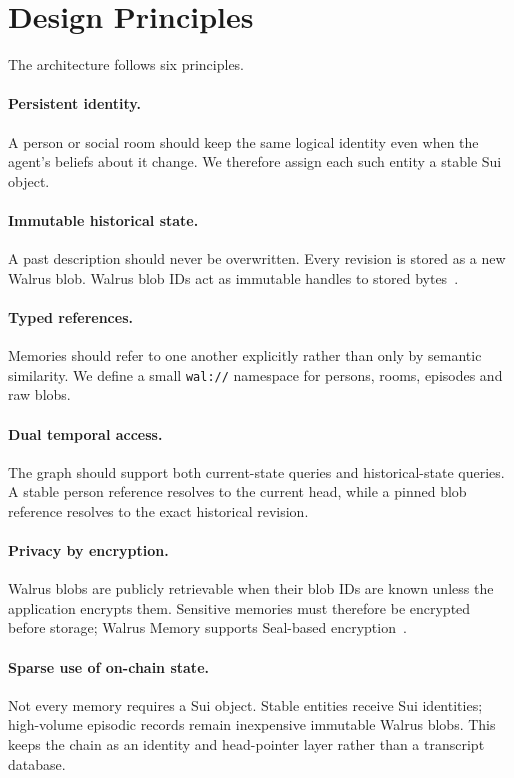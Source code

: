 \documentclass[11pt]{article}
\begin{document}
\section{Design Principles}

The architecture follows six principles.

\paragraph{Persistent identity.}
A person or social room should keep the same logical identity even when the agent's beliefs about it change. We therefore assign each such entity a stable Sui object.

\paragraph{Immutable historical state.}
A past description should never be overwritten. Every revision is stored as a new Walrus blob. Walrus blob IDs act as immutable handles to stored bytes~\cite{walrus-lineage}.

\paragraph{Typed references.}
Memories should refer to one another explicitly rather than only by semantic similarity. We define a small \texttt{wal://} namespace for persons, rooms, episodes and raw blobs.

\paragraph{Dual temporal access.}
The graph should support both current-state queries and historical-state queries. A stable person reference resolves to the current head, while a pinned blob reference resolves to the exact historical revision.

\paragraph{Privacy by encryption.}
Walrus blobs are publicly retrievable when their blob IDs are known unless the application encrypts them. Sensitive memories must therefore be encrypted before storage; Walrus Memory supports Seal-based encryption~\cite{walrus-agent-loop,walrus-console}.

\paragraph{Sparse use of on-chain state.}
Not every memory requires a Sui object. Stable entities receive Sui identities; high-volume episodic records remain inexpensive immutable Walrus blobs. This keeps the chain as an identity and head-pointer layer rather than a transcript database.
\end{document}

